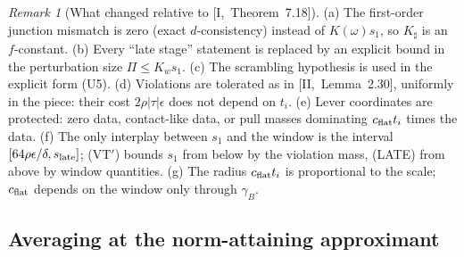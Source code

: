 \documentclass[10pt]{amsart}
\theoremstyle{definition}
\theoremstyle{remark}
\newtheorem{remark}[theorem]{Remark}
\begin{document}
\begin{remark}[What changed relative to {[I,~Theorem~7.18]}]\label{rem:III-UE}
(a) The first-order junction mismatch is zero (exact $d$-consistency) instead of
$K(\omega)s_1$, so $K_\sharp$ is an $f$-constant.  (b) Every ``late stage''
statement is replaced by an explicit bound in the perturbation size $\Pi\le
K_ws_1$.  (c) The scrambling hypothesis is used in the explicit form (U5).
(d) Violations are tolerated as in [II,~Lemma~2.30], uniformly in the piece:
their cost $2\rho|\tau|\epsilon$ does not depend on $t_i$.  (e) Lever coordinates
are protected: zero data, contact-like data, or pull masses dominating
$c_{\rm flat}t_i$ times the data.  (f) The only interplay between $s_1$ and the
window is the interval $[64\rho\epsilon/\delta,s_{\rm late}]$; (VT$'$) bounds
$s_1$ from below by the violation mass, (LATE) from above by window quantities.
(g) The radius $c_{\rm flat}t_i$ is proportional to the scale; $c_{\rm flat}$
depends on the window only through $\gamma_B$.
\end{remark}

\subsection{Averaging at the norm-attaining approximant}\label{subsec:III-Eeng}
\end{document}
